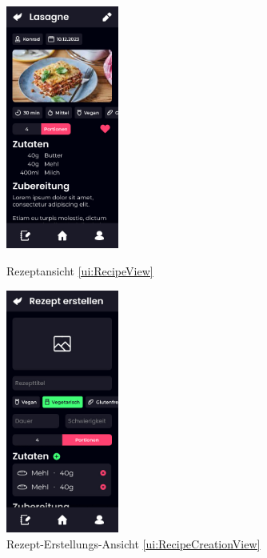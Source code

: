 \documentclass[parskip=full]{scrartcl}
\begin{document}
\begin{figure}[htp]
    \begin{minipage}
        [t]{0.49\textwidth}
        \centering
        \includegraphics[height=80mm]{images/ui/RecipeView.jpg}
        \caption{Rezeptansicht \ref{ui:RecipeView}}
        \label{fig:RecipeView}
    \end{minipage}
    \begin{minipage}
        [t]{0.49\textwidth}
        \centering
        \includegraphics[height=80mm]{images/ui/RecipeCreationView.jpg}
        \caption{Rezept-Erstellungs-Ansicht \ref{ui:RecipeCreationView}}
        \label{fig:RecipeCreationView}
    \end{minipage}
\end{figure}
\end{document}
